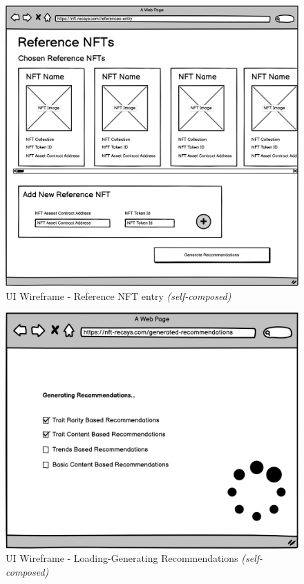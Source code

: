 \begin{figure}[h!]
\centering
\includegraphics[width=\textwidth]{images/appendix/UI Wireframes/Reference NFT entry.png}
\caption{UI Wireframe - Reference NFT entry \textit{(self-composed)}}
\end{figure}

\begin{figure}[h!]
\centering
\includegraphics[width=\textwidth]{images/appendix/UI Wireframes/Loading-Generating Recommendations.png}
\caption{UI Wireframe - Loading-Generating Recommendations \textit{(self-composed)}}
\end{figure}

